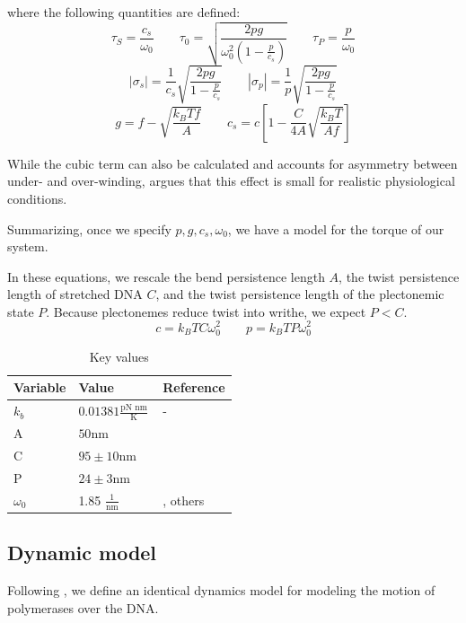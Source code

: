 \documentclass[11pt]{article}
\newcommand{\units}[2]{\frac{\text{#1}}{\text{#2}}\,}
\begin{document}
where the following quantities are defined:
\[\tau_S = \frac{c_s}{\omega_0} \qquad \tau_0 = \sqrt{\frac{2 pg}{\omega_0^2 \left(1 - \frac{p}{c_s}\right)}} \qquad \tau_P = \frac{p}{\omega_0} \]
\[|\sigma_s| = \frac{1}{c_s} \sqrt{\frac{2pg}{1 - \frac{p}{c_s}}} \qquad |\sigma_p| = \frac{1}{p} \sqrt{\frac{2pg}{1 - \frac{p}{c_s}}}\]
\[g = f - \sqrt{\frac{k_B T f}{A}} \qquad c_s = c \left[1 - \frac{C}{4A} \sqrt{\frac{k_B T}{A f}}\right]\]


While the cubic term can also be calculated and accounts for asymmetry between under- and over-winding, \textcite{markoTorqueDynamicsLinking2007} argues that this effect is small for realistic physiological conditions.


Summarizing, once we specify \(p, g, c_s, \omega_0\), we have a model for the torque of our system.

In these equations, we rescale
the bend persistence length \(A\), the twist persistence length of stretched DNA \(C\), and the twist persistence length of the plectonemic
state \(P\). Because plectonemes reduce twist into writhe, we expect \(P < C\).
\[c = k_B T C \omega_0^2 \qquad p = k_B T P \omega_0^2\]

\begin{table}[h]
    \centering
    \begin{tabular}{@{}lll@{}}
        \toprule
        Variable & Value & Reference \\
        \midrule
        \(k_b\) & \(0.01381 \units{pN nm}{K}\) & - \\
        \midrule
        A & \(50\)nm & \parencite{markoTorqueDynamicsLinking2007} \\
        C & \(95 \pm 10\)nm & \parencite{markoTorqueDynamicsLinking2007} \\
        P & \(24 \pm 3\)nm & \parencite{markoTorqueDynamicsLinking2007} \\
        \(\omega_0\) & 1.85 \(\units{1}{nm}\) & \parencite{sevierPropertiesGeneExpression2018}, others \\
        \bottomrule
    \end{tabular}
    \caption{Key values}
    \label{tab:constants}
\end{table}


\subsection{Dynamic model}
Following \textcite{sevierPropertiesGeneExpression2018}, we define an identical dynamics model for modeling the motion of polymerases over the DNA.
\end{document}
